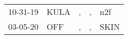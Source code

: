 \begin{supertabular}{lllll}
 10-31-19 &  KULA &  , &  , &   n2f \\
 03-05-20 &   OFF &  , &  , &  SKIN \\
\end{supertabular}
